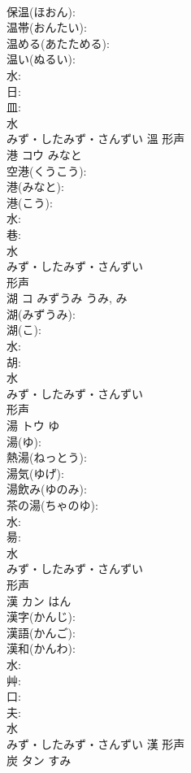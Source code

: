 \documentclass[8pt]{extreport}
\begin{document}
\begin{CJK}{UTF8}{min}
\\	保温(ほおん): 
\\	温帯(おんたい): 
\\	温める(あたためる): 
\\	温い(ぬるい): 
\\	水: 
\\	日: 
\\	皿: 
\\	水	
\\	みず・したみず・さんずい	溫	形声 
\\	港	コウ	みなと		
\\	空港(くうこう): 
\\	港(みなと): 
\\	港(こう): 
\\	水: 
\\	巷: 
\\	水	
\\	みず・したみず・さんずい	
\\	形声 
\\	湖	コ	みずうみ	うみ, み	
\\	湖(みずうみ): 
\\	湖(こ): 
\\	水: 
\\	胡: 
\\	水	
\\	みず・したみず・さんずい	
\\	形声 
\\	湯	トウ	ゆ		
\\	湯(ゆ): 
\\	熱湯(ねっとう): 
\\	湯気(ゆげ): 
\\	湯飲み(ゆのみ): 
\\	茶の湯(ちゃのゆ): 
\\	水: 
\\	昜: 
\\	水	
\\	みず・したみず・さんずい	
\\	形声 
\\	漢	カン		はん	
\\	漢字(かんじ): 
\\	漢語(かんご): 
\\	漢和(かんわ): 
\\	水: 
\\	艸: 
\\	口: 
\\	夫: 
\\	水	
\\	みず・したみず・さんずい	漢	形声 
\\	炭	タン	すみ		

\end{CJK}
\end{document}
